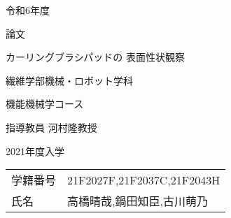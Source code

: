 \documentclass[main]{subfiles}
\begin{document}
\begin{titlepage}
    \fontsize{30pt}{30pt} \selectfont

    \centering
    \Huge
    令和6年度
    \vspace{15pt}

    論文
    \vspace{45pt}

    カーリングブラシパッドの
    表面性状観察
    \vspace{45pt}

    繊維学部機械・ロボット学科
    \vspace{15pt}

    機能機械学コース
    \vspace{15pt}

    指導教員 河村隆教授
    \vspace{45pt}

    2021年度入学
    \vspace{15pt}

    \begin{tabular}{ll}
    学籍番号 & 21F2027F,21F2037C,21F2043H\\
    氏名   & 高橋晴哉,鍋田知臣,古川萌乃\\

    \end{tabular}
    \normalsize

\end{titlepage}
\end{document}

